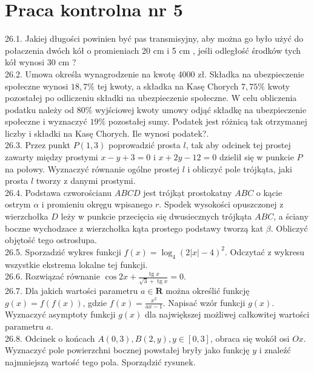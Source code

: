 \documentclass[10pt]{article}
\begin{document}
\section*{Praca kontrolna nr 5}
26.1. Jakiej długości powinien być pas transmisyjny, aby można go było użyć do połaczenia dwóch kół o promieniach 20 cm i 5 cm , jeśli odległość środków tych kół wynosi 30 cm ?\\
26.2. Umowa określa wynagrodzenie na kwotę 4000 zł. Składka na ubezpieczenie społeczne wynosi $18,7 \%$ tej kwoty, a składka na Kasę Chorych $7,75 \%$ kwoty pozostałej po odliczeniu składki na ubezpieczenie społeczne. W celu obliczenia podatku należy od $80 \%$ wyjściowej kwoty umowy odjąć składkę na ubezpieczenie społeczne i wyznaczyć $19 \%$ pozostałej sumy. Podatek jest różnicą tak otrzymanej liczby i składki na Kasę Chorych. Ile wynosi podatek?.\\
26.3. Przez punkt $P(1,3)$ poprowadzić prosta $l$, tak aby odcinek tej prostej zawarty między prostymi $x-y+3=0$ i $x+2 y-12=0$ dzielił się w punkcie $P$ na połowy. Wyznaczyć równanie ogólne prostej $l$ i obliczyć pole trójkąta, jaki prosta $l$ tworzy z danymi prostymi.\\
26.4. Podstawa czworościanu $A B C D$ jest trójkạt prostokatny $A B C$ o kącie ostrym $\alpha$ i promieniu okręgu wpisanego $r$. Spodek wysokości opuszczonej z wierzchołka $D$ leży w punkcie przecięcia się dwusiecznych trójkąta $A B C$, a ściany boczne wychodzace z wierzchołka kąta prostego podstawy tworzą kat $\beta$. Obliczyć objętość tego ostrosłupa.\\
26.5. Sporzadzić wykres funkcji $f(x)=\log _{4}(2|x|-4)^{2}$. Odczytać z wykresu wszystkie ekstrema lokalne tej funkcji.\\
26.6. Rozwiązać równanie $\cos 2 x+\frac{\operatorname{tg} x}{\sqrt{3}+\operatorname{tg} x}=0$.\\
26.7. Dla jakich wartości parametru $a \in \mathbf{R}$ można określić funkcję $g(x)=f(f(x))$, gdzie $f(x)=\frac{x^{2}}{a x-1}$. Napisać wzór funkcji $g(x)$. Wyznaczyć asymptoty funkcji $g(x)$ dla największej możliwej całkowitej wartości parametru $a$.\\
26.8. Odcinek o końcach $A(0,3), B(2, y), y \in[0,3]$, obraca się wokół osi $O x$. Wyznaczyć pole powierzchni bocznej powstałej bryły jako funkcję $y$ i znaleźć najmniejszą wartość tego pola. Sporządzić rysunek.
\end{document}
